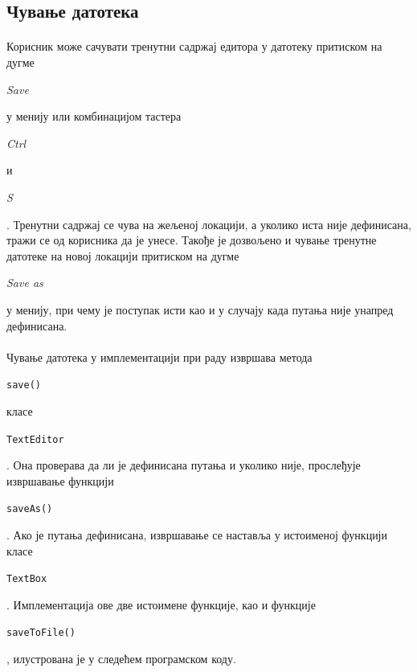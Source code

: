 \documentclass[12pt,oneside]{memoir}
\begin{document}
\subsection{Чување датотека}
\paragraph{}
Корисник може сачувати тренутни садржај едитора у датотеку притиском на дугме 
\begin{latinica}\textit{Save}\end{latinica} у менију или комбинацијом
тастера \begin{latinica}\textit{Ctrl}\end{latinica} и
\begin{latinica}\textit{S}\end{latinica}. Тренутни садржај се чува на 
жељеној локацији, а уколико иста није дефинисана, тражи се од корисника
да је унесе. Такође је дозвољено и чување тренутне датотеке на новој локацији
притиском на дугме \begin{latinica}\textit{Save as}\end{latinica} у менију, при
чему је поступак исти као и у случају када путања није унапред дефинисана.

\paragraph{}
Чување датотека у имплементацији при раду извршава метода
\begin{latinica}\verb|save()|\end{latinica} класе \begin{latinica}\verb|TextEditor|\end{latinica}. Она проверава да ли је дефинисана 
путања и уколико није, прослеђује извршавање функцији \begin{latinica}\verb|saveAs()|\end{latinica}. Ако је путања дефинисана, извршавање
се наставља у истоименој функцији класе  \begin{latinica}\verb|TextBox|\end{latinica}.
Имплементација ове две истоимене функције, као и функције \begin{latinica}\verb|saveToFile()|\end{latinica}, илустрована је у следећем програмском коду.
\end{document}
